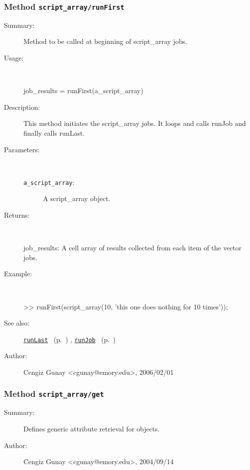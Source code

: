 \subsubsection[Method \texttt{runFirst}]{Method \texttt{script\_array/runFirst}}%
%
\label{ref_script_array__runFirst}%
\hypertarget{ref_script_array__runFirst}{}%
\begin{description}
\item[Summary:]Method to be called at beginning of script\_array jobs.
%
\item[Usage:]~%
\begin{lyxcode}%
job\_results = runFirst(a\_script\_array)
%
\end{lyxcode}%
%
\item[Description:]%
This method initiates the script\_array jobs. It loops and calls runJob and 
 finally calls runLast.
\item[Parameters:]~
\begin{description}%
\item[\texttt{a\_script\_array}:]
 A script\_array object.
\end{description}%
%
\item[Returns:]~

	job\_results: A cell array of results collected from each item of the vector jobs.
%
\item[Example:]~
\begin{lyxcode} >> runFirst(script\_array(10, 'this one does nothing for 10 times'));\\%
\end{lyxcode}
%
\item[See also:]%
\hyperlink{ref_runLast}{\texttt{runLast}}%
\ (p.~\pageref{ref_runLast})%
%
, \hyperlink{ref_runJob}{\texttt{runJob}}%
\ (p.~\pageref{ref_runJob})%
%
%
\item[Author:]%
Cengiz Gunay <cgunay@emory.edu>, 2006/02/01%
\end{description}
\methodline%
\subsubsection[Method \texttt{get}]{Method \texttt{script\_array/get}}%
%
\label{ref_script_array__get}%
\hypertarget{ref_script_array__get}{}%
\begin{description}
\item[Summary:]Defines generic attribute retrieval for objects.
%
%
%
%
%
%
%
\item[Author:]%
Cengiz Gunay <cgunay@emory.edu>, 2004/09/14%
\end{description}
\methodline%
